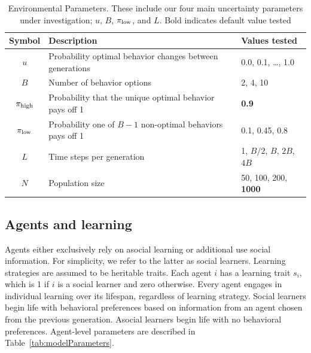 \documentclass[letterpaper,11.5pt]{scrartcl}
\begin{document}
\vspace{2em}
\begin{table}[h]
\caption{Environmental Parameters. These include our four main uncertainty parameters under investigation; $u$, $B$,
$\pi_{\mathrm{low}}$, and $L$. Bold indicates default value tested} %
    \label{tab:uncertaintyParameters}
    \centering %
    \begin{tabular}{cp{4.0in}p{1.25in}} \toprule

        Symbol & Description & Values tested \\ 

        \midrule  

        $u$    & Probability optimal behavior changes between generations 
               & 0.0, 0.1, \ldots, 1.0 \\

        $B$       & Number of behavior options
                  & 2, 4, 10 \\

        $\pi_{\mathrm{high}}$ & Probability that the unique optimal behavior pays off 1 
                & \textbf{0.9} \\

        $\pi_{\mathrm{low}}$ & Probability one of $B - 1$ non-optimal behaviors pays off 1 
                 & 0.1, 0.45, 0.8 \\ 

        $L$    & Time steps per generation & 1, $B/2$, $B$, $2B$, $4B$ \\

        $N$    & Population size
                 & 50, 100, 200, \textbf{1000} \\
               
        \bottomrule
        \end{tabular} 
\end{table}



\subsection{Agents and learning}

Agents either exclusively rely on asocial learning or additional use social information. For simplicity, we refer to the latter as social learners. Learning strategies are assumed to be heritable traits. Each agent $i$ has a learning trait $s_i$, which is 1 if $i$ is a social learner and zero otherwise. Every agent engages in
individual learning over its lifespan, regardless of learning strategy.
Social learners begin life with
behavioral preferences based on information from an agent chosen  from the previous generation. 
Asocial learners begin life with no behavioral
preferences. Agent-level parameters are described in Table~\ref{tab:modelParameters}. 
\end{document}
